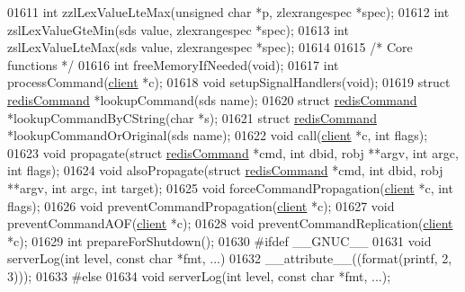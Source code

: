 \begin{DoxyCode}
{{{{{{{01611 \textcolor{keywordtype}{int} zzlLexValueLteMax(\textcolor{keywordtype}{unsigned} \textcolor{keywordtype}{char} *p, zlexrangespec *spec);
01612 \textcolor{keywordtype}{int} zslLexValueGteMin(sds value, zlexrangespec *spec);
01613 \textcolor{keywordtype}{int} zslLexValueLteMax(sds value, zlexrangespec *spec);
01614 
01615 \textcolor{comment}{/* Core functions */}
01616 \textcolor{keywordtype}{int} freeMemoryIfNeeded(\textcolor{keywordtype}{void});
01617 \textcolor{keywordtype}{int} processCommand(\hyperlink{structclient}{client} *c);
01618 \textcolor{keywordtype}{void} setupSignalHandlers(\textcolor{keywordtype}{void});
01619 \textcolor{keyword}{struct} \hyperlink{structredisCommand}{redisCommand} *lookupCommand(sds name);
01620 \textcolor{keyword}{struct} \hyperlink{structredisCommand}{redisCommand} *lookupCommandByCString(\textcolor{keywordtype}{char} *s);
01621 \textcolor{keyword}{struct} \hyperlink{structredisCommand}{redisCommand} *lookupCommandOrOriginal(sds name);
01622 \textcolor{keywordtype}{void} call(\hyperlink{structclient}{client} *c, \textcolor{keywordtype}{int} flags);
01623 \textcolor{keywordtype}{void} propagate(\textcolor{keyword}{struct} \hyperlink{structredisCommand}{redisCommand} *cmd, \textcolor{keywordtype}{int} dbid, robj **argv, \textcolor{keywordtype}{int} argc, \textcolor{keywordtype}{int} flags);
01624 \textcolor{keywordtype}{void} alsoPropagate(\textcolor{keyword}{struct} \hyperlink{structredisCommand}{redisCommand} *cmd, \textcolor{keywordtype}{int} dbid, robj **argv, \textcolor{keywordtype}{int} argc, \textcolor{keywordtype}{int} target);
01625 \textcolor{keywordtype}{void} forceCommandPropagation(\hyperlink{structclient}{client} *c, \textcolor{keywordtype}{int} flags);
01626 \textcolor{keywordtype}{void} preventCommandPropagation(\hyperlink{structclient}{client} *c);
01627 \textcolor{keywordtype}{void} preventCommandAOF(\hyperlink{structclient}{client} *c);
01628 \textcolor{keywordtype}{void} preventCommandReplication(\hyperlink{structclient}{client} *c);
01629 \textcolor{keywordtype}{int} prepareForShutdown();
01630 \textcolor{preprocessor}{#}\textcolor{preprocessor}{ifdef} \_\_GNUC\_\_
01631 \textcolor{keywordtype}{void} serverLog(\textcolor{keywordtype}{int} level, \textcolor{keyword}{const} \textcolor{keywordtype}{char} *fmt, ...)
01632     \textcolor{keyword}{\_\_attribute\_\_}((format(printf, 2, 3)));
01633 \textcolor{preprocessor}{#}\textcolor{preprocessor}{else}
01634 \textcolor{keywordtype}{void} serverLog(\textcolor{keywordtype}{int} level, \textcolor{keyword}{const} \textcolor{keywordtype}{char} *fmt, ...);
}}}}}}}
\end{DoxyCode}
